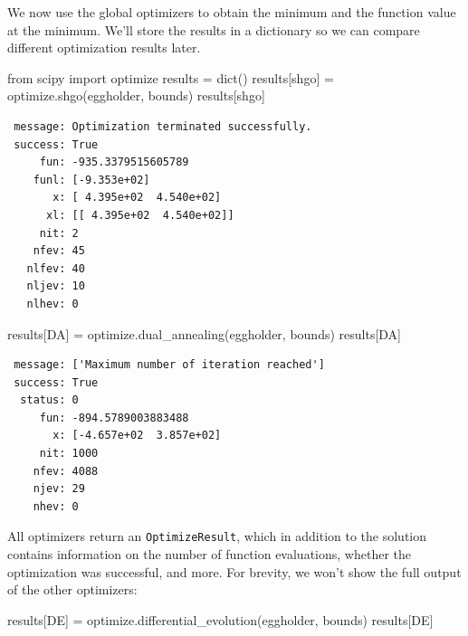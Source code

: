\documentclass[
  letterpaper,
  DIV=11,
  numbers=noendperiod]{scrreprt}
\newenvironment{Shaded}{\begin{snugshade}}{\end{snugshade}}
\newcommand{\BuiltInTok}[1]{\textcolor[rgb]{0.00,0.23,0.31}{#1}}
\newcommand{\ImportTok}[1]{\textcolor[rgb]{0.00,0.46,0.62}{#1}}
\newcommand{\NormalTok}[1]{\textcolor[rgb]{0.00,0.23,0.31}{#1}}
\newcommand{\OperatorTok}[1]{\textcolor[rgb]{0.37,0.37,0.37}{#1}}
\newcommand{\StringTok}[1]{\textcolor[rgb]{0.13,0.47,0.30}{#1}}
\begin{document}
We now use the global optimizers to obtain the minimum and the function
value at the minimum. We'll store the results in a dictionary so we can
compare different optimization results later.

\begin{Shaded}
\begin{Highlighting}[]
\ImportTok{from}\NormalTok{ scipy }\ImportTok{import}\NormalTok{ optimize}
\NormalTok{results }\OperatorTok{=} \BuiltInTok{dict}\NormalTok{()}
\NormalTok{results[}\StringTok{\textquotesingle{}shgo\textquotesingle{}}\NormalTok{] }\OperatorTok{=}\NormalTok{ optimize.shgo(eggholder, bounds)}
\NormalTok{results[}\StringTok{\textquotesingle{}shgo\textquotesingle{}}\NormalTok{]}
\end{Highlighting}
\end{Shaded}

\begin{verbatim}
 message: Optimization terminated successfully.
 success: True
     fun: -935.3379515605789
    funl: [-9.353e+02]
       x: [ 4.395e+02  4.540e+02]
      xl: [[ 4.395e+02  4.540e+02]]
     nit: 2
    nfev: 45
   nlfev: 40
   nljev: 10
   nlhev: 0
\end{verbatim}

\begin{Shaded}
\begin{Highlighting}[]
\NormalTok{results[}\StringTok{\textquotesingle{}DA\textquotesingle{}}\NormalTok{] }\OperatorTok{=}\NormalTok{ optimize.dual\_annealing(eggholder, bounds)}
\NormalTok{results[}\StringTok{\textquotesingle{}DA\textquotesingle{}}\NormalTok{]}
\end{Highlighting}
\end{Shaded}

\begin{verbatim}
 message: ['Maximum number of iteration reached']
 success: True
  status: 0
     fun: -894.5789003883488
       x: [-4.657e+02  3.857e+02]
     nit: 1000
    nfev: 4088
    njev: 29
    nhev: 0
\end{verbatim}

All optimizers return an \texttt{OptimizeResult}, which in addition to
the solution contains information on the number of function evaluations,
whether the optimization was successful, and more. For brevity, we won't
show the full output of the other optimizers:

\begin{Shaded}
\begin{Highlighting}[]
\NormalTok{results[}\StringTok{\textquotesingle{}DE\textquotesingle{}}\NormalTok{] }\OperatorTok{=}\NormalTok{ optimize.differential\_evolution(eggholder, bounds)}
\NormalTok{results[}\StringTok{\textquotesingle{}DE\textquotesingle{}}\NormalTok{]}
\end{Highlighting}
\end{Shaded}
\end{document}
